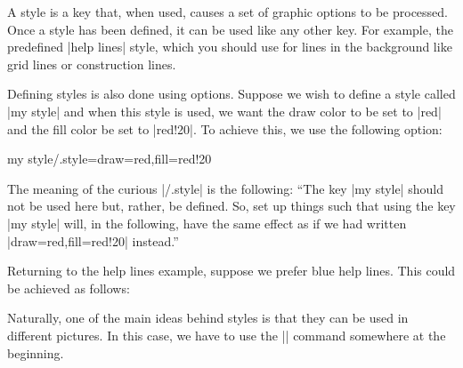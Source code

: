 A style is a key that, when used, causes a set of graphic options to be
processed. Once a style has been defined, it can be used like any other key.
For example, the predefined |help lines| style, which you should use for lines
in the background like grid lines or construction lines.
%
\begin{codeexample}[]
\end{codeexample}

Defining styles is also done using options. Suppose we wish to define a style
called |my style| and when this style is used, we want the draw color to be set
to |red| and the fill color be set to |red!20|. To achieve this, we use the
following option:
%
\begin{codeexample}
my style/.style={draw=red,fill=red!20}
\end{codeexample}

The meaning of the curious |/.style| is the following: ``The key |my style|
should not be used here but, rather, be defined. So, set up things such that
using the key |my style| will, in the following, have the same effect as if we
had written |draw=red,fill=red!20| instead.''

Returning to the help lines example, suppose we prefer blue help lines. This
could be achieved as follows:
%
\begin{codeexample}[]
\end{codeexample}

Naturally, one of the main ideas behind styles is that they can be used in
different pictures. In this case, we have to use the |\tikzset| command
somewhere at the beginning.
%
\begin{codeexample}[]
\end{codeexample}

